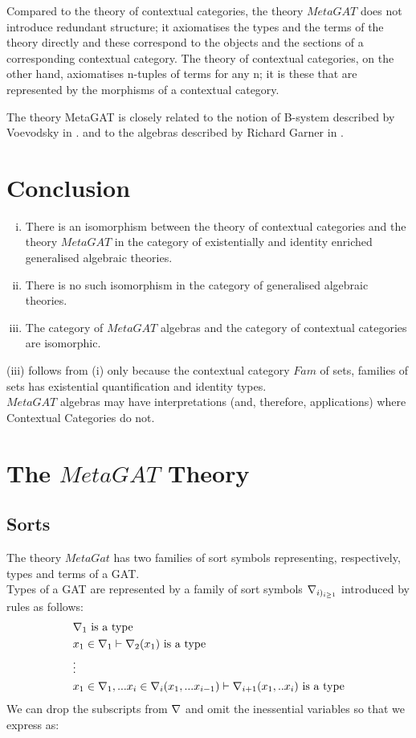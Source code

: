 \documentclass[10pt,a4paper]{scrartcl}
\begin{document}
Compared to the theory of contextual categories, the theory $MetaGAT$ does not introduce redundant structure; it axiomatises the types and the terms of the theory directly and these correspond to the objects and the sections of a corresponding contextual category. The theory of contextual categories, on the other hand, axiomatises n-tuples of terms for any n; it is  these that are represented by the morphisms of a contextual category.  

The theory MetaGAT is closely related to the notion of B-system described by Voevodsky in
\cite{Voevodsky14B}.
and to the algebras described by Richard Garner in \cite{Garner15}.  

\section{Conclusion}

\begin{enumerate}[(i)]
\item There is an isomorphism between the theory of contextual categories and the theory $MetaGAT$ in the category of existentially and identity enriched generalised algebraic theories. 
\item There is no such isomorphism in the category of generalised algebraic theories.
\item The category of $MetaGAT$ algebras and the category of contextual categories are isomorphic. 
\end{enumerate}

\noindent (iii) follows from (i) only because the contextual category $Fam$ of sets, families of sets has existential quantification and identity types. \\

\noindent $MetaGAT$ algebras may have interpretations (and, therefore, applications) where Contextual Categories do not.

\section{The $MetaGAT$ Theory}

\subsection*{Sorts}
The theory $MetaGat$ has two families of sort symbols representing, respectively,  types and terms of a GAT. \\

\noindent Types of a GAT are represented by a family of sort symbols $\nabla_{i)_{i\geq 1}}$ introduced by rules as follows: 
\begin{align*}
&\nabla_1\mbox{ is a type} \\
&x_1 \in \nabla_1 \vdash \nabla_2(x_1)\mbox{ is a type} \\
& \vdots \\
&x_1 \in \nabla_1,... x_{i} \in \nabla_{i}(x_1,...x_{i-1}) \vdash \nabla_{i+1}(x_1, ..x_{i})\mbox{ is a type} \\
\end{align*}
\noindent We can drop the subscripts from $\nabla$ and omit the inessential variables so that we express as:
\end{document}
